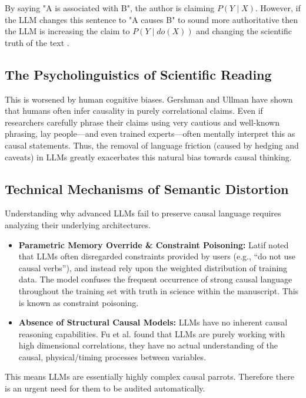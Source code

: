 \documentclass[acmsmall]{acmart}
\begin{document}
By saying "A is associated with B", the author is claiming $P(Y \mid X)$. However, if the LLM changes this sentence to "A causes B" to sound more authoritative then the LLM is increasing the claim to $P(Y \mid do(X))$ and changing the scientific truth of the text \cite{hernan2020causal}.

\subsection{The Psycholinguistics of Scientific Reading}

This is worsened by human cognitive biases. Gershman and Ullman \cite{gershman2023causal} have shown that humans often infer causality in purely correlational claims. Even if researchers carefully phrase their claims using very cautious and well-known phrasing, lay people---and even trained experts---often mentally interpret this as causal statements. Thus, the removal of language friction (caused by hedging and caveats) in LLMs greatly exacerbates this natural bias towards causal thinking.


\subsection{Technical Mechanisms of Semantic Distortion}

Understanding why advanced LLMs fail to preserve causal language requires analyzing their underlying architectures. 

\begin{itemize}
    \item \textbf{Parametric Memory Override \& Constraint Poisoning:} Latif \cite{latif2026constraint} noted that LLMs often disregarded constraints provided by users (e.g., ``do not use causal verbs''), and instead rely upon the weighted distribution of training data. The model confuses the frequent occurrence of strong causal language throughout the training set with truth in science within the manuscript. This is known as constraint poisoning.
    \item \textbf{Absence of Structural Causal Models:} LLMs have no inherent causal reasoning capabilities. Fu et al. \cite{fu2025correlation} found that LLMs are purely working with high dimensional correlations, they have no actual understanding of the causal, physical/timing processes between variables. 
\end{itemize}

This means LLMs are essentially highly complex causal parrots. Therefore there is an urgent need for them to be audited automatically.
\end{document}
